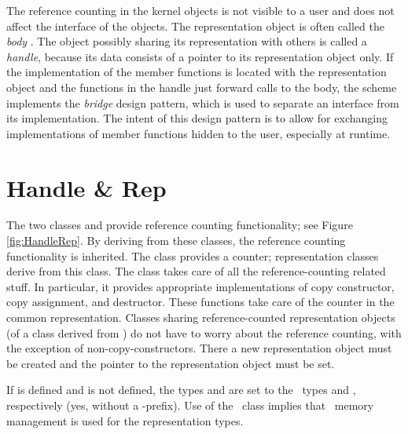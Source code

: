 The reference counting in the kernel objects is not visible to a user
and does not affect the interface of the objects. 
The representation object is often called
the {\em body}%
.
The object possibly sharing its representation with others
is called a {\em handle},
because its data consists of a pointer
to its representation object only. If the implementation of the member 
functions is located with the representation object and the functions in the 
handle just forward calls to the body, the scheme implements the {\em bridge}
design pattern,
which is used to separate an interface from its implementation.
The intent of this design pattern is to allow for exchanging implementations
of member functions hidden to the user, especially at runtime. 

\section{Handle \& Rep}
The two classes  and 
 provide reference counting
functionality; see Figure \ref{fig:HandleRep}. By deriving from these classes, 
the reference counting functionality is inherited. 
The class  provides a counter; representation classes 
derive from this class. 
The class  takes care of all the reference-counting
related stuff. In particular, it provides appropriate implementations of
copy constructor, copy assignment, and destructor. These functions
take care of the counter in the common representation. 
Classes sharing reference-counted 
representation objects (of a class derived from ) do not have to
worry about the reference counting, with the exception of non-copy-constructors.
There  a new representation object must be created and the pointer to the 
representation object must be set.

If %
is defined and %
 is not
defined, the types  and  are set to the \leda\ types
%
 and %
, respectively (yes, 
without a -prefix). Use of the \leda\ class  implies
that \leda\ memory management
is used for the representation types.

